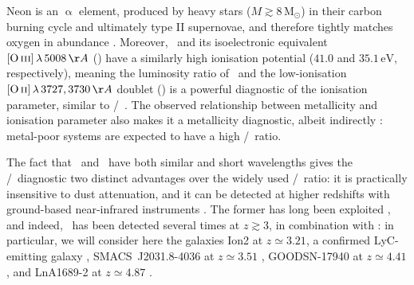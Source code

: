 Neon is an $\upalpha$ element, produced by heavy stars ($M \gtrsim 8 \, \mathrm{M_\odot}$) in their carbon burning cycle and ultimately type II supernovae, and therefore tightly matches oxygen in abundance \citep[][, and references therein]{2019A&ARv..27....3M}. Moreover, \NeIII\ and its isoelectronic equivalent $\OIIIf \, \lambda \, 5008 \, \Angstrom$ (\OIIIf) have a similarly high ionisation potential ($41.0$ and $35.1 \, \mathrm{eV}$, respectively), meaning the luminosity ratio of \NeIII\ and the low-ionisation $\OII \, \lambda \, 3727, 3730 \, \Angstrom$ doublet (\OII) is a powerful diagnostic of the ionisation parameter, similar to \OIIIf/\OII\ \citep{2007MNRAS.381..125P, 2014ApJ...780..100L, 2019A&ARv..27....3M}. The observed relationship between metallicity and ionisation parameter also makes it a metallicity diagnostic, albeit indirectly \citep[causing it to exhibit a significant amount of scatter; see][]{2006A&A...459...85N, 2008A&A...488..463M}: metal-poor systems are expected to have a high \NeIII/\OII\ ratio.

The fact that \NeIII\ and \OII\ have both similar and short wavelengths gives the \NeIII/\OII\ diagnostic two distinct advantages over the widely used \OIIIf/\OII\ ratio: it is practically insensitive to dust attenuation, and it can be detected at higher redshifts with ground-based near-infrared instruments \citep{2014ApJ...780..100L}. The former has long been exploited \citep[e.g.][]{2002ApJ...581..205H}, and indeed, \NeIII\ has been detected several times at $z \gtrsim 3$, in combination with \OII: in particular, we will consider here the galaxies Ion2 at $z \simeq 3.21$, a confirmed LyC-emitting galaxy \citep[as discussed in \cref{ssec:Discussion: CIV};][]{2016A&A...585A..51D, 2016ApJ...825...41V, 2020MNRAS.491.1093V}, SMACS~J2031.8-4036 at $z \simeq 3.51$ \citep{2012MNRAS.427.1953C, 2012MNRAS.427.1973C, 2016MNRAS.456.4191P}, GOODSN-17940 at $z \simeq 4.41$ \citep{2017ApJ...846L..30S}, and LnA1689-2 at $z \simeq 4.87$ \citep{2014A&A...563A..58T}.

